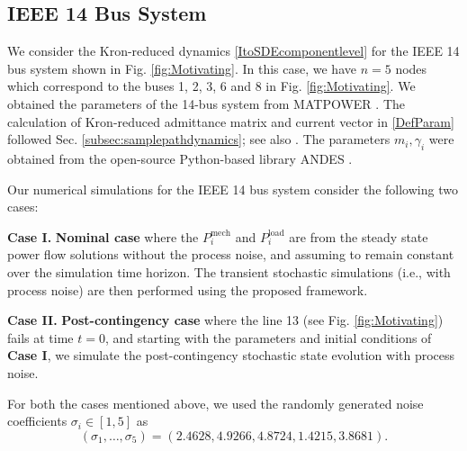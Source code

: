 \documentclass[10pt,twocolumn]{IEEEtran}
\begin{document}
\subsection{IEEE 14 Bus System}\label{subsec:NumSimIEEEBus}
We consider the Kron-reduced dynamics \eqref{ItoSDEcomponentlevel} for the IEEE 14 bus system shown in Fig. \ref{fig:Motivating}. In this case, we have $n=5$ nodes which correspond to the buses 1, 2, 3, 6 and 8 in Fig. \ref{fig:Motivating}. We obtained the parameters of the 14-bus system from MATPOWER \cite{zimmerman2010matpower}. The calculation of Kron-reduced admittance matrix and current vector in \eqref{DefParam} followed Sec.  \ref{subsec:samplepathdynamics}; see also \cite{dorfler2012kron}. The parameters $m_{i}, \gamma_{i}$ were obtained from the open-source Python-based
library ANDES \cite{cui2021andes}.

Our numerical simulations for the IEEE 14 bus system consider the following two cases:

\noindent\textbf{Case I.} \textbf{Nominal case} where the $P_{i}^{\text{mech}}$ and $P_{i}^{\text{load}}$ are from the steady state power flow solutions without the process noise, and assuming to remain constant over the simulation time horizon. The transient stochastic simulations (i.e., with process noise) are then performed using the proposed framework.

\noindent\textbf{Case II.} \textbf{Post-contingency case} where the line 13 (see Fig. \ref{fig:Motivating}) fails at time $t=0$, and starting with the parameters and initial conditions of \textbf{Case I}, we simulate the post-contingency stochastic state evolution with process noise.


 

For both the cases mentioned above, we used the randomly generated noise coefficients $\sigma_{i}\in [1,5]$ as
\vspace*{-0.1in}
$$(\sigma_{1},\hdots,\sigma_5) = \left(2.4628, 4.9266, 4.8724, 1.4215, 3.8681\right).$$
\end{document}

